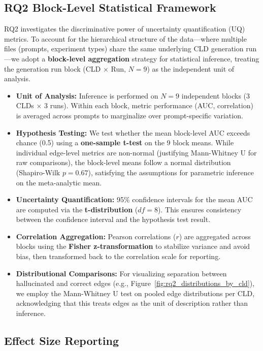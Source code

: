 \subsection{RQ2 Block-Level Statistical Framework}
\label{sec:rq2_stats}

RQ2 investigates the discriminative power of uncertainty quantification (UQ) metrics. To account for the hierarchical structure of the data---where multiple files (prompts, experiment types) share the same underlying CLD generation run---we adopt a \textbf{block-level aggregation} strategy for statistical inference, treating the generation run block (CLD $\times$ Run, $N=9$) as the independent unit of analysis.

\begin{itemize}[noitemsep]
    \item \textbf{Unit of Analysis:} Inference is performed on $N=9$ independent blocks (3 CLDs $\times$ 3 runs). Within each block, metric performance (AUC, correlation) is averaged across prompts to marginalize over prompt-specific variation.
    \item \textbf{Hypothesis Testing:} We test whether the mean block-level AUC exceeds chance (0.5) using a \textbf{one-sample t-test} on the 9 block means. While individual edge-level metrics are non-normal (justifying Mann-Whitney U for raw comparisons), the block-level means follow a normal distribution (Shapiro-Wilk $p=0.67$), satisfying the assumptions for parametric inference on the meta-analytic mean.
    \item \textbf{Uncertainty Quantification:} 95\% confidence intervals for the mean AUC are computed via the \textbf{t-distribution} ($df=8$). This ensures consistency between the confidence interval and the hypothesis test result.
    \item \textbf{Correlation Aggregation:} Pearson correlations ($r$) are aggregated across blocks using the \textbf{Fisher z-transformation} to stabilize variance and avoid bias, then transformed back to the correlation scale for reporting.
    \item \textbf{Distributional Comparisons:} For visualizing separation between hallucinated and correct edges (e.g., Figure~\ref{fig:rq2_distributions_by_cld}), we employ the Mann-Whitney U test on pooled edge distributions per CLD, acknowledging that this treats edges as the unit of description rather than inference.
\end{itemize}

\subsection{Effect Size Reporting}


